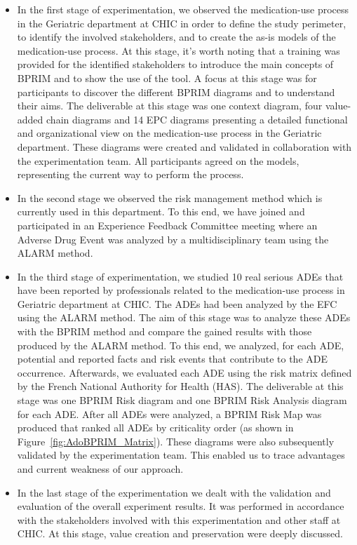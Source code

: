 \documentclass[preprint,3p,times,number]{elsarticle}
\begin{document}
\begin{itemize}
    \item In the first stage of experimentation, we observed the medication-use process in the Geriatric department at CHIC in order to define the study perimeter, to identify the involved stakeholders, and to create the as-is models of the medication-use process. At this stage, it’s worth noting that a training was provided for the identified stakeholders to introduce the main concepts of BPRIM and to show the use of the \adobprim{} tool. A focus at this stage was for participants to discover the different BPRIM diagrams and to understand their aims. The deliverable at this stage was one context diagram, four value-added chain diagrams and 14 EPC diagrams presenting a detailed functional and organizational view on the medication-use process in the Geriatric department. These diagrams were created and validated in collaboration with the experimentation team. All participants agreed on the models, representing the current way to perform the process.
    \item In the second stage we observed the risk management method which is currently used in this department. To this end, we have joined and participated in an Experience Feedback Committee meeting where an Adverse Drug Event was analyzed by a multidisciplinary team using the ALARM method.
    \item In the third stage of experimentation, we studied 10 real serious ADEs that have been reported by professionals related to the medication-use process in Geriatric department at CHIC. The ADEs had been analyzed by the EFC using the ALARM method. The aim of this stage was to analyze these ADEs with the BPRIM method and compare the gained results with those produced by the ALARM method. To this end, we analyzed, for each ADE, potential and reported facts and risk events that contribute to the ADE occurrence. Afterwards, we evaluated each ADE using the risk matrix defined by the French National Authority for Health (HAS). The deliverable at this stage was one BPRIM Risk diagram and one BPRIM Risk Analysis diagram for each ADE. After all ADEs were analyzed, a BPRIM Risk Map was produced that ranked all ADEs by criticality order (as shown in Figure~\ref{fig:AdoBPRIM_Matrix}). These diagrams were also subsequently validated by the experimentation team. This enabled us to trace advantages and current weakness of our approach.
    \item In the last stage of the experimentation we dealt with the validation and evaluation of the overall experiment results. It was performed in accordance with the stakeholders involved with this experimentation and other staff at CHIC. At this stage, value creation and preservation were deeply discussed.
\end{itemize}
\end{document}
